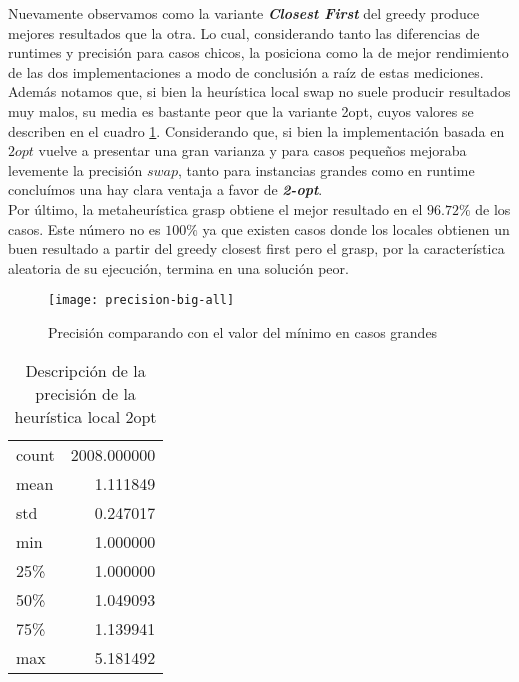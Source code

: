 Nuevamente observamos como la variante \textbf{\emph{Closest First}} del greedy produce mejores resultados que la otra. Lo cual, considerando tanto las diferencias de runtimes y precisión para casos chicos, la posiciona como la de mejor rendimiento de las dos implementaciones a modo de conclusión a raíz de estas mediciones.
\\

Además notamos que, si bien la heurística local swap no suele producir resultados muy malos,
su media es bastante peor que la variante 2opt, cuyos valores se describen en el cuadro \ref{tab:precision-big-local-2opt}. Considerando que, si bien la implementación basada en $2opt$ vuelve a presentar una gran varianza y para casos pequeños mejoraba levemente la precisión $swap$, tanto para instancias grandes como en runtime concluímos una hay clara ventaja a favor de \textbf{\emph{2-opt}}.
\\

Por último, la metaheurística grasp obtiene el mejor resultado en el $96.72\%$ de los casos.
Este número no es $100\%$ ya que existen casos donde los locales obtienen un buen resultado a partir del greedy closest first pero el grasp, por la característica aleatoria de su ejecución, termina en una solución peor.

\begin{figure}[H]
    \centering
    \texttt{[image: precision-big-all]}
    \caption{Precisión comparando con el valor del mínimo en casos grandes}
    \label{fig:precision-big-all}
\end{figure}



\begin{table}[H]
    \begin{center}
        \begin{tabular}{ l | r }
            count  & 2008.000000 \\
            mean   &    1.111849 \\
            std    &    0.247017 \\
            min    &    1.000000 \\
            25\%   &    1.000000 \\
            50\%   &    1.049093 \\
            75\%   &    1.139941 \\
            max    &    5.181492 \\
        \end{tabular}
        \caption{Descripción de la precisión de la heurística local 2opt}\label{tab:precision-big-local-2opt}
    \end{center}
\end{table}

